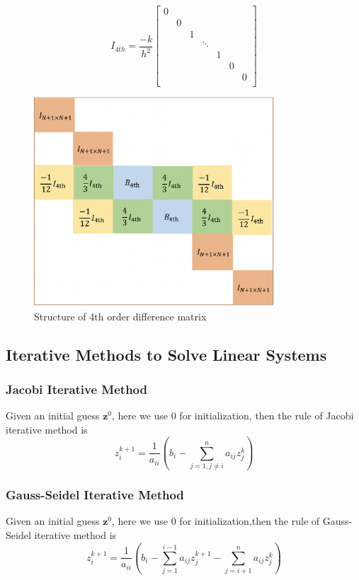 \documentclass[a4paper]{article}
\begin{document}
\[
I_{4th}
=  \frac{-k}{h^2}
\begin{bmatrix}
    0\\
    & 0\\
    &&1\\
    &&&\ddots \\
    &&&&1\\
    &&&&&0\\
    &&&&&&0\\
\end{bmatrix}
\]


\begin{figure}
\centering
\includegraphics[width=0.8\textwidth]{4th.png}
\caption{\label{4th}Structure of 4th order difference matrix}
\end{figure}

\subsection{Iterative Methods to Solve Linear Systems}
\subsubsection{Jacobi Iterative Method}
Given an initial guess $\mathbf{z}^0 $, here we use $0$ for initialization, then the rule of Jacobi iterative method is 
\begin{equation}
    z_i^{k+1} = \frac{1}{a_{ii}}(b_i-\sum_{j=1,j\neq i}^n a_{ij}z_j^k)
\end{equation}

\subsubsection{Gauss-Seidel Iterative Method}
Given an initial guess $\mathbf{z}^0$, here we use $0$ for initialization,then the rule of Gauss-Seidel iterative method is 
\begin{equation}
    z_i^{k+1} = \frac{1}{a_{ii}}(b_i-\sum_{j=1}^{i-1} a_{ij}z_j^{k+1}-\sum_{j=i+1}^{n} a_{ij}z_j^{k})
\end{equation}
\end{document}
